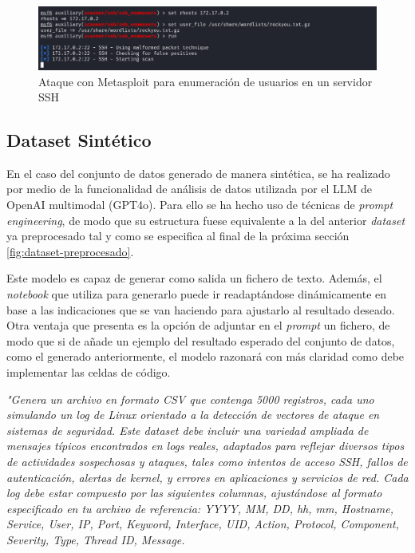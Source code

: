 \begin{figure}[H]
    \centering
    \includegraphics[width=1\linewidth]{imagenes/metasploit-attack.png}
    \caption{Ataque con Metasploit para enumeración de usuarios en un servidor \gls{SSH}}
    \label{fig:metasploit-users}
\end{figure}

\subsection{Dataset Sintético}

En el caso del conjunto de datos generado de manera sintética, se ha realizado por medio de la funcionalidad de análisis de datos utilizada por el LLM de OpenAI multimodal (\gls{GPT}4o). Para ello se ha hecho uso de técnicas de \textit{prompt engineering}, de modo que su estructura fuese equivalente a la del anterior \textit{dataset} ya preprocesado tal y como se especifica al final de la próxima sección \ref{fig:dataset-preprocesado}.

Este modelo es capaz de generar como salida un fichero de texto. Además, el \textit{notebook} que utiliza para generarlo puede ir readaptándose dinámicamente en base a las indicaciones que se van haciendo para ajustarlo al resultado deseado. Otra ventaja que presenta es la opción de adjuntar en el \textit{prompt} un fichero, de modo que si de añade un ejemplo del resultado esperado del conjunto de datos, como el generado anteriormente, el modelo razonará con más claridad como debe implementar las celdas de código. 

\begin{tcolorbox}[colframe=blue!25!white, colback=blue!10!white, title={\color{blue}\footnotesize \texttt{Prompt GPT4o - Generación Dataset Sintético}}]
\footnotesize
\textit{"Genera un archivo en formato \gls{CSV} que contenga 5000 registros, cada uno simulando un log de Linux orientado a la detección de vectores de ataque en sistemas de seguridad. Este dataset debe incluir una variedad ampliada de mensajes típicos encontrados en logs reales, adaptados para reflejar diversos tipos de actividades sospechosas y ataques, tales como intentos de acceso SSH, fallos de autenticación, alertas de kernel, y errores en aplicaciones y servicios de red. Cada log debe estar compuesto por las siguientes columnas, ajustándose al formato especificado en tu archivo de referencia: YYYY, MM, DD, hh, mm, Hostname, Service, User, IP, Port, Keyword, Interface, UID, Action, Protocol, Component, Severity, Type, Thread ID, Message.} \\
\end{tcolorbox}

